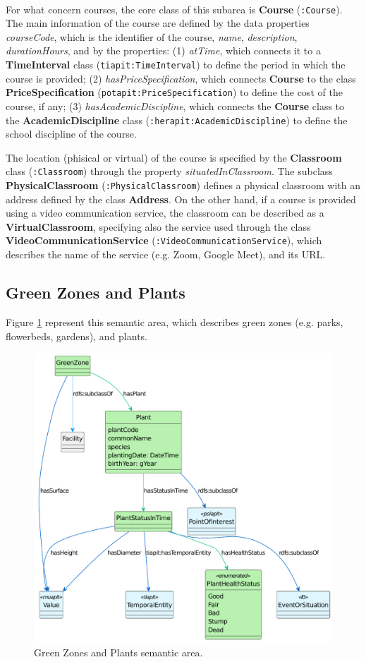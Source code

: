 \paragraph*{}
For what concern courses, the core class of this subarea is \textbf{Course} (\verb#:Course#). The main information of the course are defined by the data properties \textit{courseCode}, which is the identifier of the course, \textit{name}, \textit{description}, \textit{durationHours}, and by the properties: (1) \textit{atTime}, which connects it to a \textbf{TimeInterval} class (\verb#tiapit:TimeInterval#) to define the period in which the course is provided; (2) \textit{hasPriceSpecification}, which connects \textbf{Course} to the class \textbf{PriceSpecification} (\verb#potapit:PriceSpecification#) to define the cost of the course, if any; (3) \textit{hasAcademicDiscipline}, which connects the \textbf{Course} class to the \textbf{AcademicDiscipline} class (\verb#:herapit:AcademicDiscipline#) to define the school discipline of the course.

The location (phisical or virtual) of the course is specified by the \textbf{Classroom} class (\verb#:Classroom#) through the property \textit{situatedInClassroom}. The subclass \textbf{PhysicalClassroom} (\verb#:PhysicalClassroom#) defines a physical classroom with an address defined by the class \textbf{Address}. On the other hand, if a course is provided using a video communication service, the classroom can be described as a \textbf{VirtualClassroom}, specifying also the service used through the class \textbf{VideoCommunicationService} (\verb#:VideoCommunicationService#), which describes the name of the service (e.g. Zoom, Google Meet), and its \ac{URL}.

\subsection{Green Zones and Plants}
\label{subsec:green-zones}

Figure \ref{fig:green-sa} represent this semantic area, which describes green zones (e.g. parks, flowerbeds, gardens), and plants.

\begin{figure}[!ht]
  \centering
  \includegraphics[width=0.6\columnwidth]{images/ontoim/green}
  \caption{Green Zones and Plants semantic area.}
  \label{fig:green-sa}
\end{figure}

